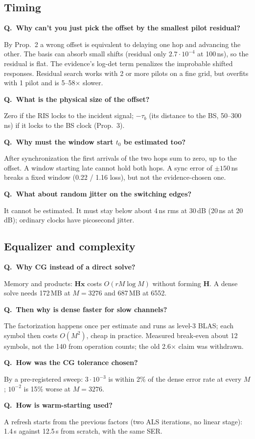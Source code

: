 \documentclass[11pt,a4paper]{article}
\newcounter{qn}
\newcommand{\Q}[1]{\stepcounter{qn}\par\medskip\noindent\textbf{Q\theqn.\ #1}\par\nopagebreak\noindent}
\begin{document}
\subsection{Timing}
\Q{Why can't you just pick the offset by the smallest pilot residual?}
By Prop.~2 a wrong offset is equivalent to delaying one hop and advancing the other. The basis can absorb small shifts
(residual only $2.7\cdot10^{-4}$ at 100\,ns), so the residual is flat. The evidence's log-det term penalizes the improbable
shifted responses. Residual search works with 2 or more pilots on a fine grid, but overfits with 1 pilot and is 5--58$\times$
slower.
\Q{What is the physical size of the offset?}
Zero if the RIS locks to the incident signal; $-\tau_b$ (its distance to the BS, 50--300\,ns) if it locks to the BS clock
(Prop.~3).
\Q{Why must the window start $t_0$ be estimated too?}
After synchronization the first arrivals of the two hops sum to zero, up to the offset. A window starting late cannot hold
both hops. A sync error of $\pm150$\,ns breaks a fixed window (0.22 / 1.16 loss), but not the evidence-chosen one.
\Q{What about random jitter on the switching edges?}
It cannot be estimated. It must stay below about 4\,ns rms at 30\,dB (20\,ns at 20\,dB); ordinary clocks have picosecond
jitter.

\subsection{Equalizer and complexity}
\Q{Why CG instead of a direct solve?}
Memory and products: $\bm H\bm x$ costs $O(rM\log M)$ without forming $\bm H$. A dense solve needs 172\,MB at $M=3276$ and
687\,MB at 6552.
\Q{Then why is dense faster for slow channels?}
The factorization happens once per estimate and runs as level-3 BLAS; each symbol then costs $O(M^2)$, cheap in practice.
Measured break-even about 12 symbols, not the 140 from operation counts; the old 2.6$\times$ claim was withdrawn.
\Q{How was the CG tolerance chosen?}
By a pre-registered sweep: $3\cdot10^{-3}$ is within 2\% of the dense error rate at every $M$; $10^{-2}$ is 15\% worse at
$M=3276$.
\Q{How is warm-starting used?}
A refresh starts from the previous factors (two ALS iterations, no linear stage): 1.4\,s against 12.5\,s from scratch, with
the same SER.
\end{document}
